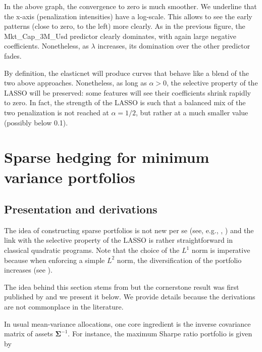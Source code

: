 \documentclass[]{krantz}
\theoremstyle{definition}
\theoremstyle{definition}
\theoremstyle{definition}
\theoremstyle{remark}
\begin{document}
\normalsize

In the above graph, the convergence to zero is much smoother. We
underline that the x-axis (penalization intensities) have a log-scale.
This allows to see the early patterns (close to zero, to the left) more
clearly. As in the previous figure, the Mkt\_Cap\_3M\_Usd predictor
clearly dominates, with again large negative coefficients. Nonetheless,
as \(\lambda\) increases, its domination over the other predictor fades.

By definition, the elasticnet will produce curves that behave like a
blend of the two above approaches. Nonetheless, as long as
\(\alpha >0\), the selective property of the LASSO will be preserved:
some features will see their coefficients shrink rapidly to zero. In
fact, the strength of the LASSO is such that a balanced mix of the two
penalization is not reached at \(\alpha = 1/2\), but rather at a much
smaller value (possibly below 0.1).

\hypertarget{sparse-hedging-for-minimum-variance-portfolios}{%
\section{Sparse hedging for minimum variance
portfolios}\label{sparse-hedging-for-minimum-variance-portfolios}}

\hypertarget{presentation-and-derivations}{%
\subsection{Presentation and
derivations}\label{presentation-and-derivations}}

The idea of constructing sparse portfolios is not new per se (see, e.g.,
\citet{brodie2009sparse}, \citet{fastrich2015constructing}) and the link
with the selective property of the LASSO is rather straightforward in
classical quadratic programs. Note that the choice of the \(L^1\) norm
is imperative because when enforcing a simple \(L^2\) norm, the
diversification of the portfolio increases (see
\citet{coqueret2015diversified}).

The idea behind this section stems from \citet{goto2015improving} but
the cornerstone result was first published by \citet{stevens1998inverse}
and we present it below. We provide details because the derivations are
not commonplace in the literature.

In usual mean-variance allocations, one core ingredient is the inverse
covariance matrix of assets \(\mathbf{\Sigma}^{-1}\). For instance, the
maximum Sharpe ratio portfolio is given by
\end{document}
